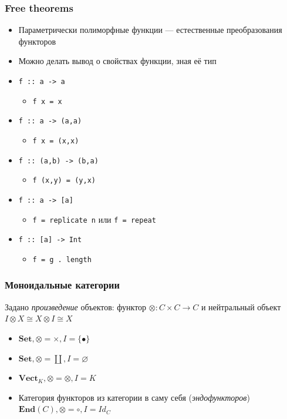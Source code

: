 \documentclass{beamer}
\begin{document}
\begin{frame}
\frametitle{Free theorems}
\begin{itemize}
\item Параметрически полиморфные функции --- естественные преобразования функторов
\item Можно делать вывод о свойствах функции, зная её тип
\end{itemize}
\pause
\begin{itemize}
\item \texttt{f :: a -> a}
\begin{itemize}
\item \texttt{f x = x}
\end{itemize}
\pause
\item \texttt{f :: a -> (a,a)}
\begin{itemize}
\item \texttt{f x = (x,x)}
\end{itemize}
\pause
\item \texttt{f :: (a,b) -> (b,a)}
\begin{itemize}
\item \texttt{f (x,y) = (y,x)}
\end{itemize}
\pause
\item \texttt{f :: a -> [a]}
\begin{itemize}
\item \texttt{f = replicate n} или \texttt{f = repeat}
\end{itemize}
\pause
\item \texttt{f :: [a] -> Int}
\begin{itemize}
\item \texttt{f = g . length}
\end{itemize}
\end{itemize}
\end{frame}

\begin{frame}
\frametitle{Моноидальные категории}
Задано \textit{произведение} объектов: функтор \begin{math}\otimes:C\times C\rightarrow C\end{math} и нейтральный объект \begin{math}I\otimes X \cong X \otimes I \cong X\end{math}
\begin{itemize}
\item \begin{math}\mathbf{Set}, \otimes = \times, I = \{\bullet\}\end{math}
\item \begin{math}\mathbf{Set}, \otimes = \coprod, I = \varnothing\end{math}
\item \begin{math}\mathbf{Vect}_K, \otimes = \otimes, I = K\end{math}
\item Категория функторов из категории в саму себя (\textit{эндофункторов}) \begin{math}\mathbf{End}(C), \otimes = \circ, I = Id_C\end{math}
\end{itemize}
\end{frame}
\end{document}
